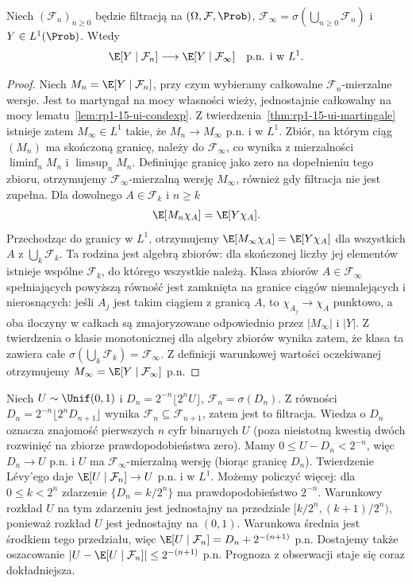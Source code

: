 \begin{twierdzenie}
Niech $(\mathcal F_n)_{n\geq0}$ będzie filtracją
na $(\Omega,\mathcal F,\Prob)$,
$\mathcal F_\infty=\sigma(\bigcup_{n\geq0}\mathcal F_n)$
i $Y\in L^1(\Prob)$. Wtedy
\[
\E[Y\mid\mathcal F_n]
\longrightarrow\E[Y\mid\mathcal F_\infty]
\quad\text{p.n. i w }L^1.
\]
\end{twierdzenie}
\begin{proof}
Niech $M_n=\E[Y\mid\mathcal F_n]$, przy czym
wybieramy całkowalne $\mathcal F_n$-mierzalne wersje.
Jest to martyngał na mocy własności wieży,
jednostajnie całkowalny na mocy
lematu~\ref{lem:rp1-15-ui-condexp}.
Z twierdzenia~\ref{thm:rp1-15-ui-martingale}
istnieje zatem $M_\infty\in L^1$ takie, że $M_n\to M_\infty$
p.n. i w $L^1$.
Zbiór, na którym ciąg $(M_n)$ ma skończoną
granicę, należy do $\mathcal F_\infty$, co
wynika z mierzalności $\liminf_n M_n$ i
$\limsup_n M_n$. Definiując granicę jako zero
na dopełnieniu tego zbioru, otrzymujemy
$\mathcal F_\infty$-mierzalną wersję $M_\infty$,
również gdy filtracja nie jest zupełna.
Dla dowolnego $A\in\mathcal F_k$ i $n\geq k$
\[
\E[M_n\chi_{A}]=\E[Y\chi_{A}].
\]
Przechodząc do granicy w $L^1$, otrzymujemy
$\E[M_\infty\chi_{A}]=\E[Y\chi_{A}]$
dla wszystkich $A$ z $\bigcup_k\mathcal F_k$.
Ta rodzina jest algebrą zbiorów: dla skończonej
liczby jej elementów istnieje wspólne
$\mathcal F_k$, do którego wszystkie należą.
Klasa zbiorów $A\in\mathcal F_\infty$
spełniających powyższą równość jest zamknięta
na granice ciągów niemalejących i nierosnących:
jeśli $A_j$ jest takim ciągiem z granicą $A$,
to $\chi_{A_j}\to\chi_A$ punktowo, a oba
iloczyny w całkach są zmajoryzowane odpowiednio
przez $|M_\infty|$ i $|Y|$.
Z twierdzenia o klasie monotonicznej dla algebry
zbiorów wynika zatem, że klasa ta zawiera
całe $\sigma(\bigcup_k\mathcal F_k)=\mathcal F_\infty$.
Z definicji warunkowej wartości oczekiwanej
otrzymujemy
$M_\infty=\E[Y\mid\mathcal F_\infty]$ p.n.
\end{proof}

\begin{przyklad}
Niech $U\sim\Unif(0,1)$ i
$D_n=2^{-n}\lfloor2^nU\rfloor$,
$\mathcal F_n=\sigma(D_n)$.
Z równości $D_n=2^{-n}\lfloor 2^n D_{n+1}\rfloor$
wynika $\mathcal F_n\subseteq\mathcal F_{n+1}$,
zatem jest to filtracja. Wiedza o $D_n$ oznacza znajomość pierwszych
$n$ cyfr binarnych $U$ (poza nieistotną
kwestią dwóch rozwinięć na zbiorze
prawdopodobieństwa zero). Mamy
$0\leq U-D_n<2^{-n}$, więc $D_n\to U$ p.n.
i $U$ ma $\mathcal F_\infty$-mierzalną wersję
(biorąc granicę $D_n$).
Twierdzenie Lévy'ego daje
$\E[U\mid\mathcal F_n]\to U$ p.n. i w $L^1$.
Możemy policzyć więcej: dla $0\leq k<2^n$
zdarzenie $\{D_n=k/2^n\}$ ma prawdopodobieństwo
$2^{-n}$. Warunkowy rozkład $U$ na tym zdarzeniu
jest jednostajny na przedziale
$[k/2^n,(k+1)/2^n)$, ponieważ rozkład $U$
jest jednostajny na $(0,1)$.
Warunkowa średnia jest środkiem tego przedziału,
więc $\E[U\mid\mathcal F_n]=D_n+2^{-(n+1)}$ p.n.
Dostajemy także oszacowanie
$|U-\E[U\mid\mathcal F_n]|\leq2^{-(n+1)}$ p.n.
Prognoza z obserwacji staje się coraz dokładniejsza.
\end{przyklad}

